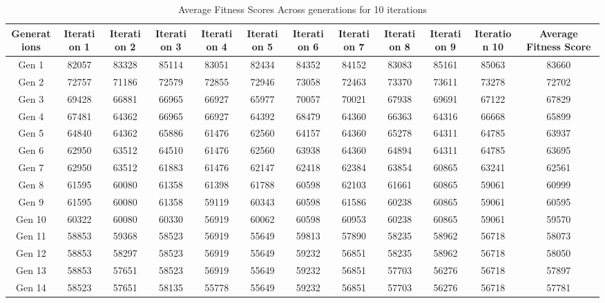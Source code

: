 \documentclass[12pt]{article}
\begin{document}
\begin{table}[h]
    \centering
    \caption{Average Fitness Scores Across generations for 10 iterations}
    \label{tab:fitness_scores}
    \begin{adjustbox}{max width=0.7\textwidth} %
        \begin{tabular}{*{12}{c}}
            \toprule
            Generations & Iteration 1 & Iteration 2 & Iteration 3 & Iteration 4 & Iteration 5 & Iteration 6 & Iteration 7 & Iteration 8 & Iteration 9 & Iteration 10 & Average Fitness Score \\
            \midrule
            Gen 1 & 82057 & 83328 & 85114 & 83051 & 82434 & 84352 & 84152 & 83083 & 85161 & 85063 & 83660 \\
            Gen 2 & 72757 & 71186 & 72579 & 72855 & 72946 & 73058 & 72463 & 73370 & 73611 & 73278 & 72702 \\
            Gen 3 & 69428 & 66881 & 66965 & 66927 & 65977 & 70057 & 70021 & 67938 & 69691 & 67122 & 67829 \\
            Gen 4 & 67481 & 64362 & 66965 & 66927 & 64392 & 68479 & 64360 & 66363 & 64316 & 66668 & 65899 \\
            Gen 5 & 64840 & 64362 & 65886 & 61476 & 62560 & 64157 & 64360 & 65278 & 64311 & 64785 & 63937 \\
            Gen 6 & 62950 & 63512 & 64510 & 61476 & 62560 & 63938 & 64360 & 64894 & 64311 & 64785 & 63695 \\
            Gen 7 & 62950 & 63512 & 61883 & 61476 & 62147 & 62418 & 62384 & 63854 & 60865 & 63241 & 62561 \\
            Gen 8 & 61595 & 60080 & 61358 & 61398 & 61788 & 60598 & 62103 & 61661 & 60865 & 59061 & 60999 \\
            Gen 9 & 61595 & 60080 & 61358 & 59119 & 60343 & 60598 & 61586 & 60238 & 60865 & 59061 & 60595 \\
            Gen 10 & 60322 & 60080 & 60330 & 56919 & 60062 & 60598 & 60953 & 60238 & 60865 & 59061 & 59570 \\
            Gen 11 & 58853 & 59368 & 58523 & 56919 & 55649 & 59813 & 57890 & 58235 & 58962 & 56718 & 58073 \\
            Gen 12 & 58853 & 58297 & 58523 & 56919 & 55649 & 59232 & 56851 & 58235 & 58962 & 56718 & 58050 \\
            Gen 13 & 58853 & 57651 & 58523 & 56919 & 55649 & 59232 & 56851 & 57703 & 56276 & 56718 & 57897 \\
            Gen 14 & 58523 & 57651 & 58135 & 55778 & 55649 & 59232 & 56851 & 57703 & 56276 & 56718 & 57781 \\

\end{tabular}
\end{adjustbox}
\end{table}
\end{document}
